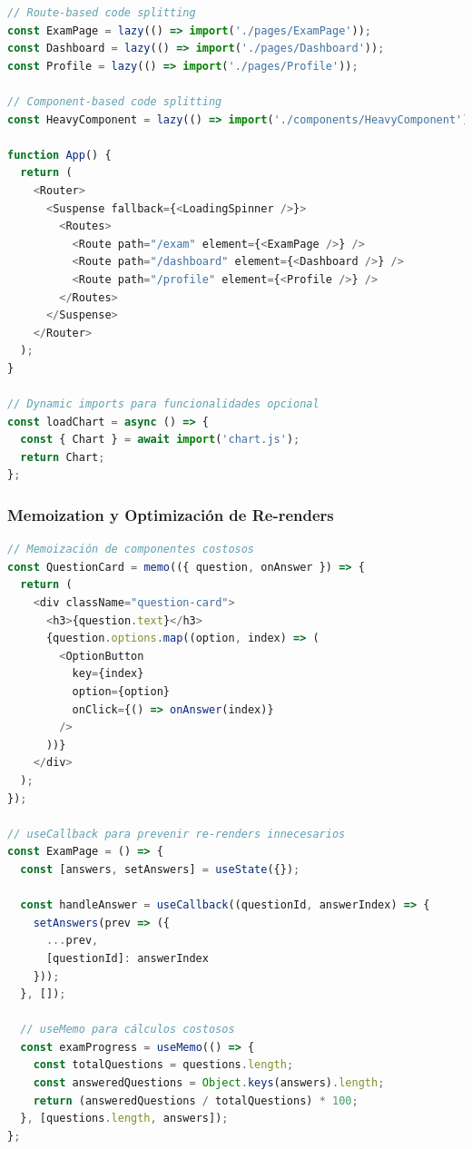 \documentclass[12pt,a4paper]{report}
\begin{document}
\begin{lstlisting}[language=JavaScript, caption=Implementación de code splitting con React.lazy]
// Route-based code splitting
const ExamPage = lazy(() => import('./pages/ExamPage'));
const Dashboard = lazy(() => import('./pages/Dashboard'));
const Profile = lazy(() => import('./pages/Profile'));

// Component-based code splitting
const HeavyComponent = lazy(() => import('./components/HeavyComponent'));

function App() {
  return (
    <Router>
      <Suspense fallback={<LoadingSpinner />}>
        <Routes>
          <Route path="/exam" element={<ExamPage />} />
          <Route path="/dashboard" element={<Dashboard />} />
          <Route path="/profile" element={<Profile />} />
        </Routes>
      </Suspense>
    </Router>
  );
}

// Dynamic imports para funcionalidades opcional
const loadChart = async () => {
  const { Chart } = await import('chart.js');
  return Chart;
};
\end{lstlisting}

\subsubsection{Memoization y Optimización de Re-renders}

\begin{lstlisting}[language=JavaScript, caption=Optimizaciones de React con memo y useCallback]
// Memoización de componentes costosos
const QuestionCard = memo(({ question, onAnswer }) => {
  return (
    <div className="question-card">
      <h3>{question.text}</h3>
      {question.options.map((option, index) => (
        <OptionButton 
          key={index}
          option={option}
          onClick={() => onAnswer(index)}
        />
      ))}
    </div>
  );
});

// useCallback para prevenir re-renders innecesarios
const ExamPage = () => {
  const [answers, setAnswers] = useState({});
  
  const handleAnswer = useCallback((questionId, answerIndex) => {
    setAnswers(prev => ({
      ...prev,
      [questionId]: answerIndex
    }));
  }, []);
  
  // useMemo para cálculos costosos
  const examProgress = useMemo(() => {
    const totalQuestions = questions.length;
    const answeredQuestions = Object.keys(answers).length;
    return (answeredQuestions / totalQuestions) * 100;
  }, [questions.length, answers]);
};
\end{lstlisting}
\end{document}
